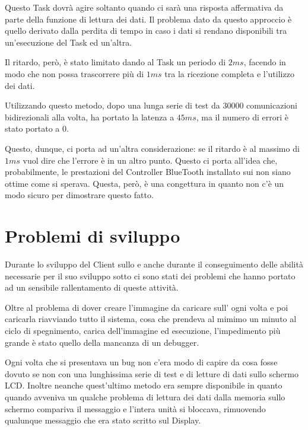 Questo Task dovrà agire soltanto quando ci sarà una risposta affermativa da
parte della funzione di lettura dei dati. Il problema dato da questo
approccio è quello derivato dalla perdita di tempo in caso i dati si
rendano disponibili tra un'esecuzione del Task ed un'altra.

Il ritardo, però, è stato limitato dando al Task un periodo di $2ms$,
facendo in modo che non possa trascorrere più di $1ms$ tra la ricezione
completa e l'utilizzo dei dati.

Utilizzando questo metodo, dopo una lunga serie di test da $30000$
comunicazioni bidirezionali alla volta, ha portato la latenza a $45ms$, ma
il numero di errori è stato portato a $0$.

Questo, dunque, ci porta ad un'altra considerazione: se il ritardo è al
massimo di $1ms$ vuol dire che l'errore è in un altro punto. Questo ci
porta all'idea che, probabilmente, le prestazioni del Controller BlueTooth
installato sui \nxt{} non siano ottime come si sperava. Questa, però, è una
congettura in quanto non c'è un modo sicuro per dimostrare questo fatto.

\section{Problemi di sviluppo}
Durante lo sviluppo del Client sullo \SPAM{} e anche durante il
conseguimento delle abilità necessarie per il suo sviluppo sotto
\nxtOSEK{} ci sono stati dei problemi che hanno portato ad un sensibile
rallentamento di queste attività.

Oltre al problema di dover creare l'immagine da caricare sull'\nxt{} ogni
volta e poi caricarla riavviando tutto il sistema, cosa che prendeva al
mimimo un minuto al ciclo di spegnimento, carica dell'immagine ed
esecuzione, l'impedimento più grande è stato quello della mancanza di un
debugger.

Ogni volta che si presentava un bug non c'era modo di capire da cosa fosse
dovuto se non con una lunghissima serie di test e di letture di dati sullo
schermo LCD. Inoltre neanche quest'ultimo metodo era sempre disponibile in
quanto quando avveniva un qualche problema di lettura dei dati dalla
memoria sullo schermo compariva il messaggio  e l'intera
unità si bloccava, rimuovendo qualunque messaggio che era stato scritto
sul Display.

\cleardoublepage
